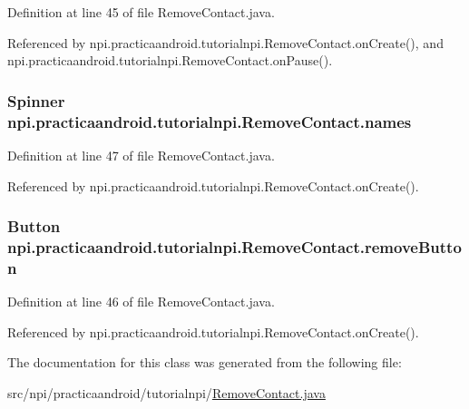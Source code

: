 Definition at line 45 of file Remove\-Contact.\-java.



Referenced by npi.\-practicaandroid.\-tutorialnpi.\-Remove\-Contact.\-on\-Create(), and npi.\-practicaandroid.\-tutorialnpi.\-Remove\-Contact.\-on\-Pause().

\hypertarget{classnpi_1_1practicaandroid_1_1tutorialnpi_1_1_remove_contact_a3107d242c1dd4ee41c561a9d11b9b8fd}{
\subsubsection[{names}]{\setlength{\rightskip}{0pt plus 5cm}Spinner npi.\-practicaandroid.\-tutorialnpi.\-Remove\-Contact.\-names\hspace{0.3cm}{\ttfamily [private]}}}\label{classnpi_1_1practicaandroid_1_1tutorialnpi_1_1_remove_contact_a3107d242c1dd4ee41c561a9d11b9b8fd}


Definition at line 47 of file Remove\-Contact.\-java.



Referenced by npi.\-practicaandroid.\-tutorialnpi.\-Remove\-Contact.\-on\-Create().

\hypertarget{classnpi_1_1practicaandroid_1_1tutorialnpi_1_1_remove_contact_aa9dcb9cb24640807d67d9bb4db3a83f7}{
\subsubsection[{remove\-Button}]{\setlength{\rightskip}{0pt plus 5cm}Button npi.\-practicaandroid.\-tutorialnpi.\-Remove\-Contact.\-remove\-Button\hspace{0.3cm}{\ttfamily [private]}}}\label{classnpi_1_1practicaandroid_1_1tutorialnpi_1_1_remove_contact_aa9dcb9cb24640807d67d9bb4db3a83f7}


Definition at line 46 of file Remove\-Contact.\-java.



Referenced by npi.\-practicaandroid.\-tutorialnpi.\-Remove\-Contact.\-on\-Create().



The documentation for this class was generated from the following file\-:\begin{DoxyCompactItemize}
\item 
src/npi/practicaandroid/tutorialnpi/\hyperlink{_remove_contact_8java}{Remove\-Contact.\-java}\end{DoxyCompactItemize}
